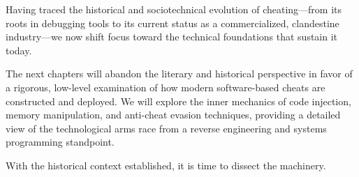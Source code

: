 Having traced the historical and sociotechnical evolution of cheating—from its roots in debugging tools to its current status as a commercialized, clandestine industry—we now shift focus toward the technical foundations that sustain it today. 

The next chapters will abandon the literary and historical perspective in favor of a rigorous, low-level examination of how modern software-based cheats are constructed and deployed. We will explore the inner mechanics of code injection, memory manipulation, and anti-cheat evasion techniques, providing a detailed view of the technological arms race from a reverse engineering and systems programming standpoint.

With the historical context established, it is time to dissect the machinery.


\newpage



